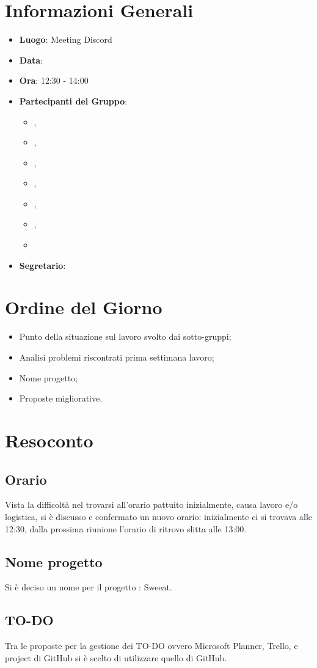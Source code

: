 \section{Informazioni Generali}

\begin{itemize}
\item{\textbf{Luogo}}: Meeting Discord
\item{\textbf{Data}}: \D{}
\item{\textbf{Ora}}: 12:30 - 14:00
\item{\textbf{Partecipanti del Gruppo}}: 
	\begin{itemize}
	\item{\EP{},} 
	\item{\FP{},}
	\item{\GC{},}
	\item{\LW{},}
	\item{\MB{},}
	\item{\MG{},}
	\item{\PV{}}
	\end{itemize} 
\item{\textbf{Segretario}}: \PV{}	
\end{itemize}

\section{Ordine del Giorno}
\begin{itemize}
\item{Punto della situazione sul lavoro svolto dai sotto-gruppi;}
\item{Analisi problemi riscontrati prima settimana lavoro;}
\item{Nome progetto;}
\item{Proposte migliorative.}
\end{itemize}

\section{Resoconto}

\subsection{Orario}
Vista la difficoltà nel trovarsi all'orario pattuito inizialmente, causa lavoro e/o logistica, si è discusso e confermato un nuovo orario: inizialmente ci si trovava alle 12:30, dalla prossima riunione l'orario di ritrovo slitta alle 13:00.

\subsection{Nome progetto}
Si è deciso un nome per il progetto : Sweeat.


\subsection{TO-DO}
Tra le proposte per la gestione dei TO-DO ovvero Microsoft Planner, Trello, e project di GitHub si è scelto di utilizzare quello di GitHub.